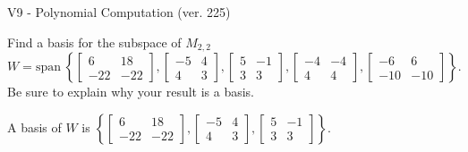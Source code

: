 \begin{exercise}
  \begin{exerciseTitle}V9 - Polynomial Computation (ver. 225)\end{exerciseTitle}
  \begin{exerciseStatement}
    Find a basis for the subspace of \(M_{2,2}\) 
\[W=\mathrm{span}\ \left\{\left[\begin{array}{cc}
6 & 18 \\
-22 & -22
\end{array}\right] , \left[\begin{array}{cc}
-5 & 4 \\
4 & 3
\end{array}\right] , \left[\begin{array}{cc}
5 & -1 \\
3 & 3
\end{array}\right] , \left[\begin{array}{cc}
-4 & -4 \\
4 & 4
\end{array}\right] , \left[\begin{array}{cc}
-6 & 6 \\
-10 & -10
\end{array}\right]\right\}.\]
 Be sure to explain why your result is a basis.


  \end{exerciseStatement}
  \begin{exerciseAnswer}
   A basis of \(W\) is  \(\left\{\left[\begin{array}{cc}
6 & 18 \\
-22 & -22
\end{array}\right] , \left[\begin{array}{cc}
-5 & 4 \\
4 & 3
\end{array}\right] , \left[\begin{array}{cc}
5 & -1 \\
3 & 3
\end{array}\right]\right\}\).
  


  \end{exerciseAnswer}
\end{exercise}